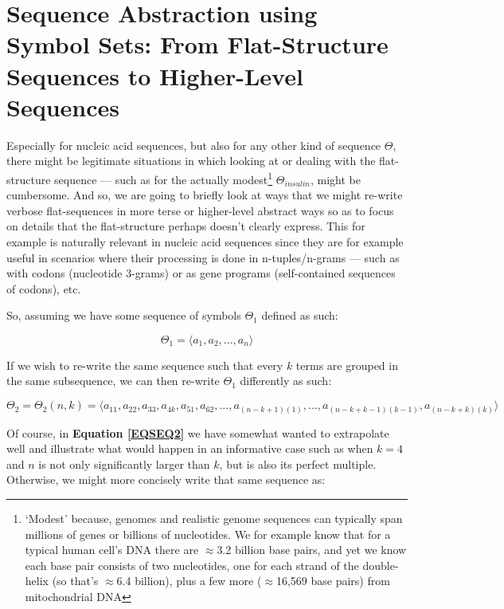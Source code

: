 \documentclass[a4paper, 18pt]{book} %
\begin{document}
\chapter{Sequence Abstraction using Symbol Sets: From Flat-Structure Sequences to Higher-Level Sequences}
\label{SECSEQAB}

Especially for nucleic acid sequences, but also for any other kind of sequence $\Theta$, there might be legitimate situations in which looking at or dealing with the flat-structure sequence --- such as for the actually modest\footnote{`Modest' because, genomes and realistic genome sequences can typically span millions of genes or billions of nucleotides. We for example know that for a typical human cell's DNA there are $\approx$3.2 billion base pairs\cite{Venter2001}, and yet we know each base pair consists of two nucleotides, one for each strand of the double-helix (so that's $\approx$6.4 billion), plus a few more ($\approx$16,569 base pairs) from mitochondrial DNA\cite{Anderson1981}} $\Theta_{insulin}$, might be cumbersome. And so, we are going to briefly look at ways that we might re-write verbose flat-sequences in more terse or higher-level abstract ways so as to focus on details that the flat-structure perhaps doesn't clearly express. This for example is naturally relevant in nucleic acid sequences since they are for example useful in scenarios where their processing is done in n-tuples/n-grams --- such as with codons (nucleotide 3-grams) or as gene programs (self-contained sequences of codons), etc.

So, assuming we have some sequence of symbols $\Theta_1$ defined as such:

\begin{equation}
\label{EQSEQ1}
\Theta_1 = \langle a_1, a_2,...,a_n\rangle
\end{equation}

If we wish to re-write the same sequence such that every $k$ terms are grouped in the same subsequence, we can then re-write $\Theta_1$ differently as such:


\begin{equation}
\label{EQSEQ2}
\Theta_2 = \Theta_2(n,k) = \langle a_{11}, a_{22}, a_{33}, a_{4k}, a_{51}, a_{62},...,a_{(n-k+1)(1)},...,a_{(n-k+k-1)(k-1)},a_{(n-k+k)(k)}\rangle
\end{equation}

Of course, in \textbf{Equation \ref{EQSEQ2}} we have somewhat wanted to extrapolate well and illustrate what would happen in an informative case such as when $k = 4$ and $n$ is not only significantly larger than $k$, but is also its perfect multiple. Otherwise, we might more concisely write that same sequence as:
\end{document}

